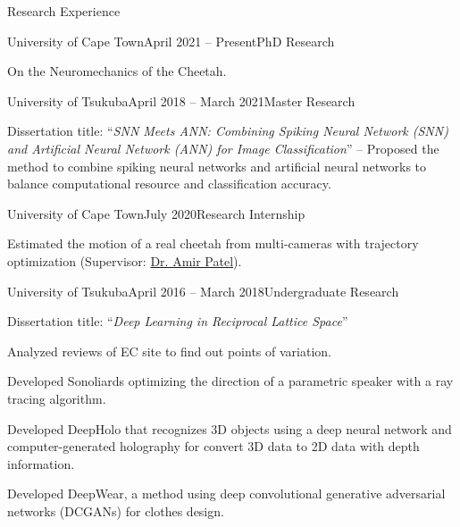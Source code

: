 \documentclass{resume} %
\begin{document}
\begin{rSection}{Research Experience}

    \begin{rSubsection}{University of Cape Town}{April 2021 -- Present}{PhD Research}{}
    \item On the Neuromechanics of the Cheetah.
    \end{rSubsection}

    \begin{rSubsection}{University of Tsukuba}{April 2018 -- March 2021}{Master Research}{}
    \item Dissertation title: ``{\it SNN Meets ANN: Combining Spiking Neural Network (SNN) and Artificial Neural Network (ANN) for Image Classification}'' -- Proposed the method to combine spiking neural networks and artificial neural networks to balance computational resource and classification accuracy.
    \end{rSubsection}

    \begin{rSubsection}{University of Cape Town}{July 2020}{Research Internship}{}
    \item Estimated the motion of a real cheetah from multi-cameras with trajectory optimization (Supervisor: \href{https://scholar.google.co.za/citations?user=RxMigV4AAAAJ&view_op=list_works&sortby=pubdate}{Dr. Amir Patel}).
    \end{rSubsection}

    \begin{rSubsection}{University of Tsukuba}{April 2016 -- March 2018}{Undergraduate Research}{}
    \item Dissertation title: ``{\it Deep Learning in Reciprocal Lattice Space}''
    \item Analyzed reviews of EC site to find out points of variation.
    \item Developed Sonoliards optimizing the direction of a parametric speaker with a ray tracing algorithm.
    \item Developed DeepHolo that recognizes 3D objects using a deep neural network and computer-generated holography for convert 3D data to 2D data with depth information.
    \item Developed DeepWear, a method using deep convolutional generative adversarial networks (DCGANs) for clothes design.
    \end{rSubsection}


\end{rSection}
\end{document}
